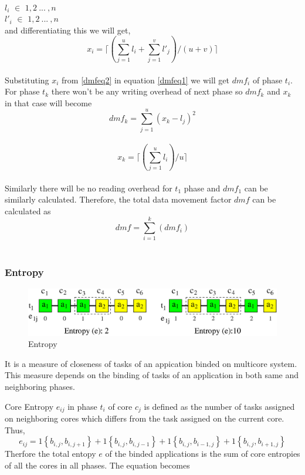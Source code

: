 \documentclass[10pt, conference]{IEEEtran}
\begin{document}
\ \\
$l_i$ $\in$ ${1, 2\:...\:, n}$ \ \\
$l'_i$ $\in$ ${1, 2\:...\:, n}$ \ \\
and differentiating this we will get, \ \\
\begin{equation} 
x_i=\lceil(\sum_{j=1}^{u} l_i + \sum_{j=1}^{v} l'_j) /(u+v) \rceil
\label{dmfeq2}
\end{equation} 
\ \\
Substituting $x_i$ from \ref{dmfeq2} in equation \ref{dmfeq1} we will get $dmf_i$ of phase $t_i$. For phase $t_k$ there won't be any writing overhead of next phase so $dmf_k$ and $x_k$ in that case will become 
\begin{equation} 
dmf_k=\sum_{j=1}^{u}(x_k-l_j)^2
\label{dmfeq3}
\end{equation}
\ \\
\begin{equation} 
x_k =\lceil(\sum_{j=1}^{u} l_i) /u \rceil
\label{dmfeq4}
\end{equation} 
\ \\
Similarly there will be no reading overhead for $t_1$ phase and $dmf_1$ can be similarly calculated. Therefore, the total data movement factor $dmf$ can be calculated as 
\begin{equation} 
dmf = \sum_{i=1}^{k}(dmf_i)
\label{dmfeq5}
\end{equation} 
\ \\
\subsubsection{Entropy}
\begin{figure}[tb]
\centering 
\includegraphics[scale=0.5]{./figure/entropy.eps}
\vspace{0.0cm}\caption{Entropy}
\vspace{-0.1cm}
\label{entropy}
\end{figure}

It is a measure of closeness of tasks of an appication binded on multicore system. This measure depends on the binding of tasks of an application in both same and neighboring phases.

Core Entropy $e_{ij}$ in phase $t_i$ of core $c_j$ is defined as the number of tasks assigned on neighboring cores which differs from the task assigned on the current core. Thus,
\begin{equation} 
e_{ij} = 1\left \{ b_{i,j},b_{i,j+1} \right \} + 1\left \{ b_{i,j},b_{i,j-1} \right \} + 1\left \{ b_{i,j},b_{i-1,j} \right \} + 1\left \{ b_{i,j},b_{i+1,j} \right \} 
\label{ce}
\end{equation} 
Therfore the total entopy $e$ of the binded applications is the sum of core entropies of all the cores in all phases. The equation becomes
\end{document}

